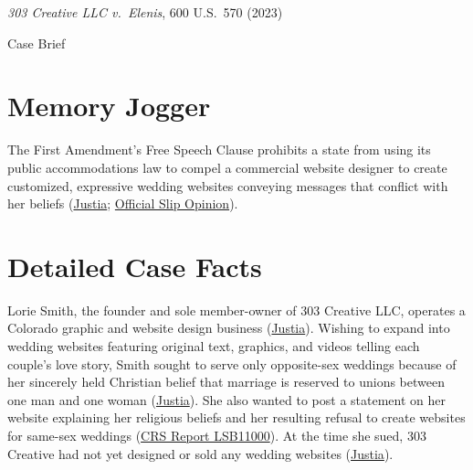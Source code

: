\documentclass[12pt]{article}
\begin{document}
\begin{center}
{\LARGE \textit{303 Creative LLC v.\ Elenis}, 600 U.S.\ 570 (2023)\par}
\vspace{0.8em}
{\large Case Brief\par}
\end{center}
\vspace{1em}

\section{Memory Jogger}
The First Amendment's Free Speech Clause prohibits a state from using its public accommodations law to compel a commercial website designer to create customized, expressive wedding websites conveying messages that conflict with her beliefs (\href{https://supreme.justia.com/cases/federal/us/600/21-476/}{Justia}; \href{https://www.supremecourt.gov/opinions/22pdf/21-476_c185.pdf}{Official Slip Opinion}).

\section{Detailed Case Facts}
Lorie Smith, the founder and sole member-owner of 303 Creative LLC, operates a Colorado graphic and website design business (\href{https://supreme.justia.com/cases/federal/us/600/21-476/}{Justia}). Wishing to expand into wedding websites featuring original text, graphics, and videos telling each couple's love story, Smith sought to serve only opposite-sex weddings because of her sincerely held Christian belief that marriage is reserved to unions between one man and one woman (\href{https://supreme.justia.com/cases/federal/us/600/21-476/}{Justia}). She also wanted to post a statement on her website explaining her religious beliefs and her resulting refusal to create websites for same-sex weddings (\href{https://www.everycrsreport.com/reports/LSB11000.html}{CRS Report LSB11000}). At the time she sued, 303 Creative had not yet designed or sold any wedding websites (\href{https://supreme.justia.com/cases/federal/us/600/21-476/}{Justia}).
\end{document}
